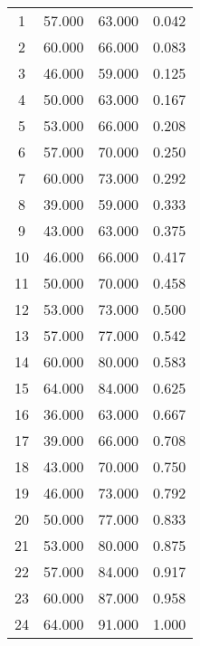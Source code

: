 % 
\begin{tabular}{cccc}
  \hline
  \hline
1 & 57.000 & 63.000 & 0.042 \\ 
  2 & 60.000 & 66.000 & 0.083 \\ 
  3 & 46.000 & 59.000 & 0.125 \\ 
  4 & 50.000 & 63.000 & 0.167 \\ 
  5 & 53.000 & 66.000 & 0.208 \\ 
  6 & 57.000 & 70.000 & 0.250 \\ 
  7 & 60.000 & 73.000 & 0.292 \\ 
  8 & 39.000 & 59.000 & 0.333 \\ 
  9 & 43.000 & 63.000 & 0.375 \\ 
  10 & 46.000 & 66.000 & 0.417 \\ 
  11 & 50.000 & 70.000 & 0.458 \\ 
  12 & 53.000 & 73.000 & 0.500 \\ 
  13 & 57.000 & 77.000 & 0.542 \\ 
  14 & 60.000 & 80.000 & 0.583 \\ 
  15 & 64.000 & 84.000 & 0.625 \\ 
  16 & 36.000 & 63.000 & 0.667 \\ 
  17 & 39.000 & 66.000 & 0.708 \\ 
  18 & 43.000 & 70.000 & 0.750 \\ 
  19 & 46.000 & 73.000 & 0.792 \\ 
  20 & 50.000 & 77.000 & 0.833 \\ 
  21 & 53.000 & 80.000 & 0.875 \\ 
  22 & 57.000 & 84.000 & 0.917 \\ 
  23 & 60.000 & 87.000 & 0.958 \\ 
  24 & 64.000 & 91.000 & 1.000 \\ 
   \hline
\end{tabular}
